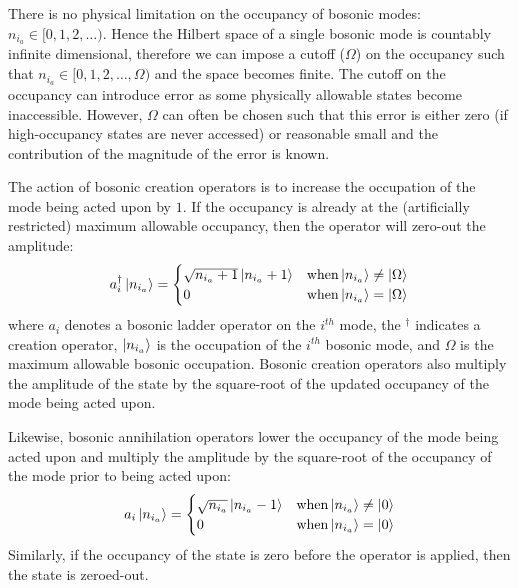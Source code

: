 There is no physical limitation on the occupancy of bosonic modes: $n_{i_a} \in [0, 1, 2, \dots)$.
Hence the Hilbert space of a single bosonic mode is countably infinite dimensional, therefore we can impose a cutoff ($\Omega$) on the occupancy such that $n_{i_a} \in [0, 1, 2, \dots, \Omega)$ and the space becomes finite.
The cutoff on the occupancy can introduce error as some physically allowable states become inaccessible.
However, $\Omega$ can often be chosen such that this error is either zero (if high-occupancy states are never accessed) or reasonable small and the contribution of the magnitude of the error is known. 

The action of bosonic creation operators is to increase the occupation of the mode being acted upon by $1$.
If the occupancy is already at the (artificially restricted) maximum allowable occupancy, then the operator will zero-out the amplitude:
\begin{equation}
    \label{eq:bosonic-creation}
    a_i^\dagger \ket{n_{i_a}} = 
    \begin{cases} 
        \sqrt{n_{i_a} + 1} \ket{n_{i_a} + 1}  & {\rm when} \ket{n_{i_a}} \neq \ket{\Omega} \\
        0 & {\rm when} \ket{n_{i_a}} = \ket{\Omega}
    \end{cases}
\end{equation}
where $a_i$ denotes a bosonic ladder operator on the $i^{th}$ mode, the $^\dagger$ indicates a creation operator, $\ket{n_{i_a}}$ is the occupation of the $i^{th}$ bosonic mode, and $\Omega$ is the maximum allowable bosonic occupation.
Bosonic creation operators also multiply the amplitude of the state by the square-root of the updated occupancy of the mode being acted upon.

Likewise, bosonic annihilation operators lower the occupancy of the mode being acted upon and multiply the amplitude by the square-root of the occupancy of the mode prior to being acted upon:
\begin{equation}
    \label{eq:bosonic-annihilation}
    a_i \ket{n_{i_a}} = 
    \begin{cases} 
        \sqrt{n_{i_a}} \ket{n_{i_a} - 1}  & {\rm when} \ket{n_{i_a}} \neq \ket{0} \\
        0 & {\rm when} \ket{n_{i_a}} = \ket{0}
    \end{cases}
\end{equation}
Similarly, if the occupancy of the state is zero before the operator is applied, then the state is zeroed-out.

